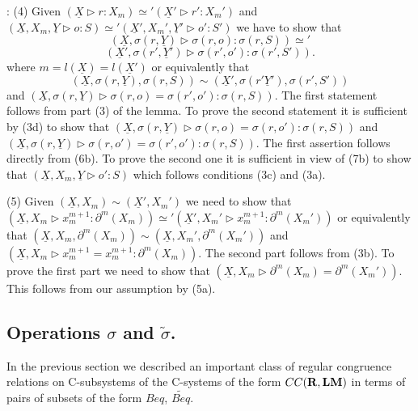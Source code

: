 \documentclass[11pt]{article}
\newenvironment{proof}{{\bf Proof}:}{\vskip 5mm }
\newcommand{\rr}{{\bf R}}
\newcommand{\lm}{{\bf LM}}
\newcommand{\uu}{\underline}
\newcommand{\wt}{\widetilde}
\begin{document}
\begin{proof}
(4) Given $(\uu{X}\rhd r:X_m)\simeq'(\uu{X}'\rhd r':X_m')$ and $(\uu{X},X_m,\uu{Y}\rhd o:S)\simeq'(\uu{X}',X_m',\uu{Y}'\rhd o':S')$ we have to show that 
%
$$(\uu{X},\sigma(r,\uu{Y})\rhd \sigma(r,o):\sigma(r,S))\simeq'$$ 
$$ (\uu{X}',\sigma(r',\uu{Y}')\rhd \sigma(r',o'):\sigma(r',S')).$$
%
%
where $m=l(\uu{X})=l(\uu{X}')$ or equivalently that 
%
$$(\uu{X},\sigma(r,\uu{Y}),\sigma(r,S))\sim(\uu{X}',\sigma(r'\uu{Y}'), \sigma(r',S'))$$
%
and $(\uu{X},\sigma(r,\uu{Y})\rhd \sigma(r,o)=\sigma(r',o'):\sigma(r,S))$. The first statement follows from part (3) of the lemma. To prove the second statement it is sufficient by (3d) to show that  $(\uu{X},\sigma(r,\uu{Y})\rhd \sigma(r,o)=\sigma(r,o'):\sigma(r,S))$ and  $(\uu{X},\sigma(r,\uu{Y})\rhd \sigma(r,o')=\sigma(r',o'):\sigma(r,S))$. The first assertion follows directly from (6b). To prove the second one it is sufficient in view of (7b) to show that $(\uu{X},X_m,\uu{Y}\rhd o':S)$ which follows conditions (3c) and (3a).

(5) Given $(\uu{X},X_m)\sim(\uu{X}',X_m')$ we need to show that $(\uu{X},X_m\rhd x^{m+1}_{m}:\partial^m(X_m))\simeq'(\uu{X}',X_m'\rhd x^{m+1}_{m}:\partial^m(X_m'))$ or equivalently that $(\uu{X},X_m,\partial^m(X_m))\sim(\uu{X},X_m',\partial^m(X_m'))$ and $(\uu{X},X_m\rhd x^{m+1}_{m}=x^{m+1}_{m}:\partial^m(X_m))$. The second part follows from (3b). To prove the first part we need to show that $(\uu{X},X_m\rhd \partial^m(X_m)=\partial^m(X_m'))$. This follows from our assumption by (5a). 
\end{proof}
%






\subsection{Operations $\sigma$ and $\wt{\sigma}$.}
%
In the previous section we described an important class of regular congruence relations on C-subsystems of the C-systems of the form $CC(\rr,\lm)$ in terms of pairs of subsets of the form $Beq$, $\wt{Beq}$. 

\end{document}
